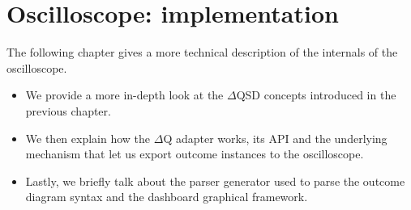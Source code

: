 \chapter{Oscilloscope: implementation}
    The following chapter gives a more technical description of the internals of the oscilloscope.
    \begin{itemize} 
        \item We provide a more in-depth look at the $\Delta$QSD concepts introduced in the previous chapter.
        \item We then explain how the $\Delta$Q adapter works, its API and the underlying mechanism that let us export outcome instances to the oscilloscope.
        \item Lastly, we briefly talk about the parser generator used to parse the outcome diagram syntax and the dashboard graphical framework.
    \end{itemize}

    
    
    
    

